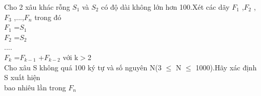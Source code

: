 Cho 2 xâu khác rỗng $S_{1}$   và $S_{2}$   có độ dài không lớn hơn 100.Xét các dãy $F_{1}$   ,$F_{2}$   ,$F_{3}$   ,...,$F_{n}$   trong đó   
\\   $F_{1}$   =$S_{1}$
\\   $F_{2}$   =$S_{2}$
\\   ....   
\\   $F_{k}$   =$F_{k-1}$   +$F_{k-2}$   với k$>$2   
\\   Cho xâu S không quá 100 ký tự và số nguyên N(3 $\le$ N $\le$ 1000).Hãy xác định S xuất hiện   
\\   bao nhiêu lần trong $F_{n}$
\\
\\
\\